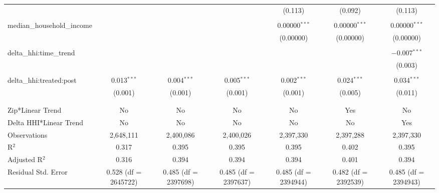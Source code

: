 \begin{table}[H]
{\begin{tabular}{@{\extracolsep{5pt}}lcccccc}
   &  &  &  & (0.113) & (0.092) & (0.113) \\  

   & & & & & & \\  

  median\_household\_income &  &  &  & 0.00000$^{***}$ & 0.00000$^{***}$ & 0.00000$^{***}$ \\  

   &  &  &  & (0.00000) & (0.00000) & (0.00000) \\  

   & & & & & & \\  

  delta\_hhi:time\_trend &  &  &  &  &  & $-$0.007$^{***}$ \\  

   &  &  &  &  &  & (0.003) \\  

   & & & & & & \\  

  delta\_hhi:treated:post & 0.013$^{***}$ & 0.004$^{***}$ & 0.005$^{***}$ & 0.002$^{***}$ & 0.024$^{***}$ & 0.034$^{***}$ \\  

   & (0.001) & (0.001) & (0.001) & (0.001) & (0.005) & (0.011) \\  

   & & & & & & \\  

 \hline \\[-1.8ex]  

 Zip*Linear Trend & No & No & No & No & Yes & No \\  

 Delta HHI*Linear Trend & No & No & No & No & No & Yes \\  

 Observations & 2,648,111 & 2,400,086 & 2,400,026 & 2,397,330 & 2,397,288 & 2,397,330 \\  

 R$^{2}$ & 0.317 & 0.395 & 0.395 & 0.395 & 0.402 & 0.395 \\  

 Adjusted R$^{2}$ & 0.316 & 0.394 & 0.394 & 0.394 & 0.401 & 0.394 \\  

 Residual Std. Error & 0.528 (df = 2645722) & 0.485 (df = 2397698) & 0.485 (df = 2397637) & 0.485 (df = 2394944) & 0.482 (df = 2392539) & 0.485 (df = 2394943) \\  

 \hline  


\end{tabular}}
\end{table}
